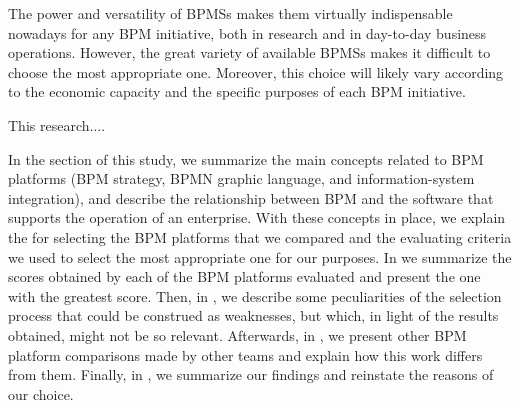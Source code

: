 The power and versatility of BPMSs makes them virtually indispensable nowadays for any BPM initiative, both in research and in day-to-day business operations. However,  the great variety of available BPMSs  makes it difficult to choose the most appropriate one. Moreover, this choice will likely vary according to the economic capacity and the specific purposes of each BPM initiative. 

This research....

In the %
section of this study, we summarize the main concepts related to BPM 
platforms (BPM strategy, BPMN graphic language, and information-system integration), and describe the relationship between BPM and the software that supports the operation of an enterprise. With these concepts in place, we explain the 
for selecting the BPM platforms that we compared and the evaluating criteria we used to select the most appropriate one for our purposes. In 
we summarize the scores obtained by each of the BPM platforms evaluated and present the  one with the greatest score. Then, in 
, we describe some peculiarities of the selection process that could be construed as weaknesses, but which, in light of the results obtained, might not be so relevant. Afterwards, in 
, we present other BPM platform comparisons made by other teams and explain how this work differs from them. Finally, in 
, we summarize our findings and reinstate the reasons of our choice. 

